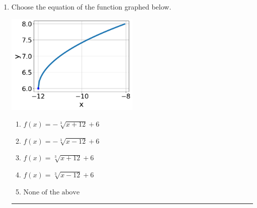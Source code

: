 \documentclass[14pt]{extbook}
\newcommand{\litem}[1]{\item#1\hspace*{-1cm}\rule{\textwidth}{0.4pt}}
\begin{document}
\begin{enumerate}
{\begin{enumerate}[label=\Alph*.]
\end{enumerate} }
\litem{
Choose the equation of the function graphed below.
\begin{center}
    \includegraphics[width=0.5\textwidth]{../Figures/radicalGraphToEquationA.png}
\end{center}
\begin{enumerate}[label=\Alph*.]
\item \( f(x) = - \sqrt[3]{x + 12} + 6 \)
\item \( f(x) = - \sqrt[3]{x - 12} + 6 \)
\item \( f(x) = \sqrt[3]{x + 12} + 6 \)
\item \( f(x) = \sqrt[3]{x - 12} + 6 \)
\item \( \text{None of the above} \)


\end{enumerate}}
\end{enumerate}
\end{document}
